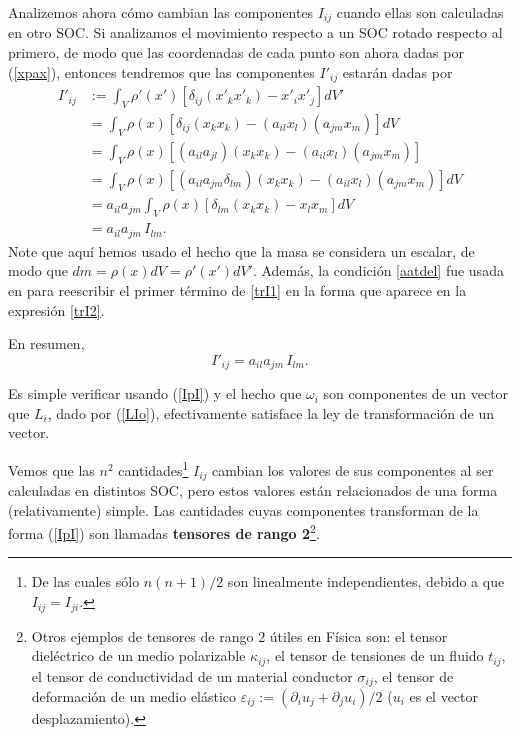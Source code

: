 Analizemos ahora cómo cambian las componentes $I_{ij}$ cuando ellas son calculadas en otro SOC. Si analizamos el movimiento respecto a un SOC rotado respecto al primero, de modo que las coordenadas de cada punto son ahora dadas por (\ref{xpax}), entonces tendremos que las componentes $I'_{ij}$ estarán dadas por
\begin{align}
I'_{ij} &:= \int_V\rho'(x')\left[\delta_{ij}(x'_kx'_k)-x'_i x'_j\right]dV'  \\
&= \int_V\rho(x)\left[\delta_{ij}(x_kx_k)-(a_{il}x_l)(a_{jm}x_m)\right]dV \label{trI1}\\
&= \int_V\rho(x)\left[(a_{il}a_{jl})(x_kx_k)-(a_{il}x_l)(a_{jm}x_m)\right] \label{trI2}\\
&= \int_V\rho(x)\left[(a_{il}a_{jm}\delta_{lm})(x_kx_k)-(a_{il}x_l)(a_{jm}x_m)\right]dV \\
&= a_{il}a_{jm}\int_V\rho(x)\left[\delta_{lm}(x_kx_k)-x_lx_m\right]dV \\
&= a_{il}a_{jm}\,I_{lm}.
\end{align}
Note que aquí hemos usado el hecho que la masa se considera un escalar, de modo que $dm=\rho(x)dV=\rho'(x')dV'$. Además, la condición \eqref{aatdel} fue usada en para reescribir el primer término de \eqref{trI1} en la forma que aparece en la expresión \eqref{trI2}.

En resumen,
\begin{equation}\label{IpI}
I'_{ij} =a_{il}a_{jm}\,I_{lm}.
\end{equation}

Es simple verificar usando (\ref{IpI}) y el hecho que $\omega_i$ son componentes de un vector que $L_i$, dado por (\ref{LIo}), efectivamente satisface la ley de transformación de un vector.

Vemos que las $n^2$ cantidades\footnote{De las cuales sólo $n(n+1)/2$ son linealmente independientes, debido a que $I_{ij}=I_{ji}$.} $I_{ij}$ cambian los valores de sus componentes al ser calculadas en distintos SOC, pero estos valores están relacionados de una forma (relativamente) simple. Las cantidades cuyas componentes transforman de la forma (\ref{IpI}) son llamadas \textbf{tensores de rango 2}\footnote{Otros ejemplos de tensores de rango 2 útiles en Física son: el tensor dieléctrico de un medio polarizable $\kappa_{ij}$, el tensor de tensiones de un fluido $t_{ij}$, el tensor de conductividad de un material conductor $\sigma_{ij}$, el tensor de deformación de un medio elástico $\varepsilon_{ij}:=(\partial_i u_j+\partial_j u_i)/2$ ($u_i$ es el vector desplazamiento).}.

